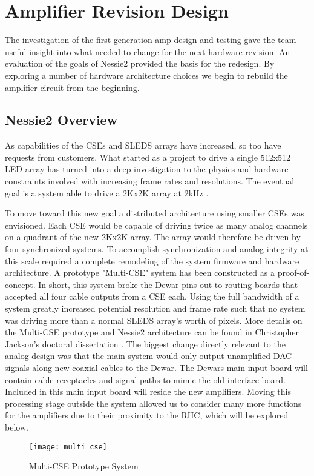 %
%
\chapter{Amplifier Revision Design}
The investigation of the first generation amp design and testing gave the team useful insight into what needed to change for the next hardware revision. An evaluation of the goals of Nessie2 provided the basis for the redesign. By exploring a number of hardware architecture choices we begin to rebuild the amplifier circuit from the beginning.
\section{Nessie2 Overview}
As capabilities of the CSEs and SLEDS arrays have increased, so too have requests from customers. What started as a project to drive a single 512x512 LED array has turned into a deep investigation to the physics and hardware constraints involved with increasing frame rates and resolutions. The eventual goal is a system able to drive a 2Kx2K array at 2kHz \cite{chris}.\par To move toward this new goal a distributed architecture using smaller CSEs was envisioned. Each CSE would be capable of driving twice as many analog channels on a quadrant of the new 2Kx2K array. The array would therefore be driven by four synchronized systems. To accomplish synchronization and analog integrity at this scale required a complete remodeling of the system firmware and hardware architecture. A prototype "Multi-CSE" system has been constructed as a proof-of-concept. In short, this system broke the Dewar pins out to routing boards that accepted all four cable outputs from a CSE each. Using the full bandwidth of a system greatly increased potential resolution and frame rate such that no system was driving more than a normal SLEDS array's worth of pixels. More details on the Multi-CSE prototype and Nessie2 architecture can be found in Christopher Jackson's doctoral dissertation \cite{chris}. The biggest change directly relevant to the analog design was that the main system would only output unamplified DAC signals along new coaxial cables to the Dewar. The Dewars main input board will contain cable receptacles and signal paths to mimic the old interface board. Included in this main input board will reside the new amplifiers. Moving this processing stage outside the system allowed us to consider many more functions for the amplifiers due to their proximity to the RIIC, which will be explored below.
\FloatBarrier
\begin{figure}[!htb]
	\centering
	\texttt{[image: multi\_cse]}
	\caption{Multi-CSE Prototype System}
\end{figure}

